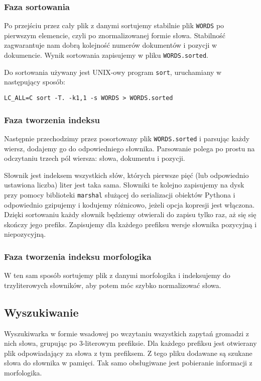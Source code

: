 \documentclass[11pt]{article}
\begin{document}
\subsubsection{Faza sortowania}
Po przejściu przez cały plik z danymi sortujemy stabilnie plik \texttt{WORDS} po pierwszym elemencie, czyli po znormalizowanej formie słowa. Stabilność zagwarantuje nam dobrą kolejność numerów dokumentów i pozycji w dokumencie. Wynik sortowania zapisujemy w pliku \texttt{WORDS.sorted}.

Do sortowania używany jest UNIX-owy program \texttt{sort}, uruchamiany w następujący sposób:
\begin{verbatim}
LC_ALL=C sort -T. -k1,1 -s WORDS > WORDS.sorted
\end{verbatim}

\subsubsection{Faza tworzenia indeksu}
Następnie przechodzimy przez posortowany plik \texttt{WORDS.sorted} i parsując każdy wiersz, dodajemy go do odpowiedniego słownika. Parsowanie polega po prostu na odczytaniu trzech pól wiersza: słowa, dokumentu i pozycji.

Słownik jest indeksem wszystkich słów, których pierwsze pięć (lub odpowiednio ustawiona liczba) liter jest taka sama. Słowniki te kolejno zapisujemy na dysk przy pomocy biblioteki \texttt{marshal} służącej do serializacji obiektów Pythona i odpowiednio gzipujemy i kodujemy różnicowo, jeżeli opcja kopresji jest włączona. Dzięki sortowaniu każdy słownik będziemy otwierali do zapisu tylko raz, aż się się skończy jego prefiks. Zapisujemy dla każdego prefiksu wersje słownika pozycyjną i niepozycyjną.

\subsubsection{Faza tworzenia indeksu morfologika}
W ten sam sposób sortujemy plik z danymi morfologika i indeksujemy do trzyliterowych słowników, aby potem móc szybko normalizować słowa.

\subsection{Wyszukiwanie}
Wyszukiwarka w formie wsadowej po wczytaniu wszystkich zapytań gromadzi z nich słowa, grupując po 3-literowym prefiksie. Dla każdego prefiksu jest otwierany plik odpowiadający za słowa z tym prefiksem. Z tego pliku dodawane są szukane słowa do słownika w pamięci. Tak samo obsługiwane jest pobieranie informacji z morfologika.
\end{document}

